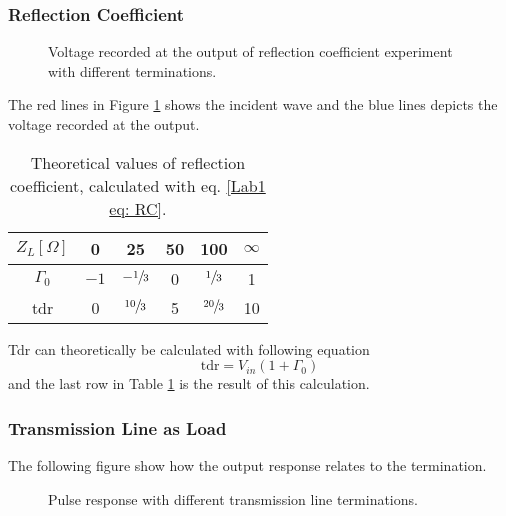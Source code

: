 \documentclass[report.tex]{subfiles}
\begin{document}
\clearpage

\subsubsection{Reflection Coefficient}\label{subsubsec:Lab1 ref coeff}

\begin{figure}[H]
    \centering
    
	\caption{Voltage recorded at the output of reflection coefficient experiment with different terminations.}
	\label{fig:Lab 1 Voltage recorded at the output.}
\end{figure}

The red lines in Figure \ref{fig:Lab 1 Voltage recorded at the output.} shows the incident wave and the blue lines depicts the voltage recorded at the output.

\begin{table}[h]
    \centering
    \caption{Theoretical values of reflection coefficient, calculated with eq. \ref{Lab1 eq: RC}.}
    \begin{tabular}{c | c | c | c | c | c}
        $Z_{L} [\Omega]$ & 0 & 25 & 50 & 100 & $\infty$ \\
        \hline
         $\Gamma_0$ & $-1$ & $-\sfrac{1}{3}$ & 0 & $\sfrac{1}{3}$ & 1 \\
         \hline
         tdr & 0 & $\sfrac{10}{3}$ & 5 & $\sfrac{20}{3}$ & 10
    \end{tabular}
    \label{Lab 1 table: RC}
\end{table}

Tdr can theoretically be calculated with following equation 
\begin{equation}
 \text{tdr} =	{V_{in}} \left( 1 + \Gamma_0 \right)
\end{equation}
and the last row in Table \ref{Lab 1 table: RC} is the result of this calculation.

\subsubsection{Transmission Line as Load}
The following figure show how the output response relates to the termination.

\begin{figure}[H]
	\centering
	\caption{Pulse response with different transmission line terminations.}
	\label{fig:Lab 1 Pulse responses.}
\end{figure}
\end{document}
